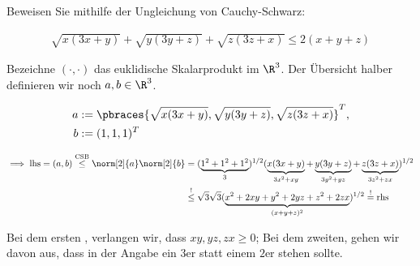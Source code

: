 
\begin{exercise}

Beweisen Sie mithilfe der Ungleichung von Cauchy-Schwarz:

\begin{align*}
    \sqrt{x (3x + y)} + \sqrt{y (3y + z)} + \sqrt{z (3z + x)}
    \leq
    2 (x + y + z)
\end{align*}

\end{exercise}


\begin{solution}

Bezeichne $(\cdot, \cdot)$ das euklidische Skalarprodukt im $\R^3$.
Der Übersicht halber definieren wir noch $a, b \in \R^3$.

\begin{align*}
    a & := \pbraces
    {
        \sqrt{x (3x + y)},
        \sqrt{y (3y + z)},
        \sqrt{z (3z + x)}
    }^T, \\
    b & := (1, 1, 1)^T
\end{align*}

\begin{align*}
    \implies
    \text{lhs}
    =
    (a, b)
    \stackrel{\text{CSB}}{\leq}
    \norm[2]{a} \norm[2]{b}
    & =
    (
        \underbrace
        {1^2 + 1^2 + 1^2}_{3}
    )^{1/2}
    (
        \underbrace{x (3x + y)}_{3x^2 + xy}
        +
        \underbrace{y (3y + z)}_{3y^2 + yz}
        +
        \underbrace{z (3z + x)}_{3z^2 + zx}
    )^{1/2} \\
    & \stackrel{!}{\leq}
    \sqrt{3} \sqrt{3}
    (
        \underbrace
        {x^2 + 2xy + y^2 + 2yz + z^2 + 2zx}_{(x + y + z)^2}
    )^{1/2}
    \stackrel{!}{=}
    \text{rhs}
\end{align*}

Bei dem ersten \Quote{!}, verlangen wir, dass $xy, yz, zx \geq 0$;
Bei dem zweiten, gehen wir davon aus, dass in der Angabe ein $3$er statt einem $2$er stehen sollte.

\end{solution}

